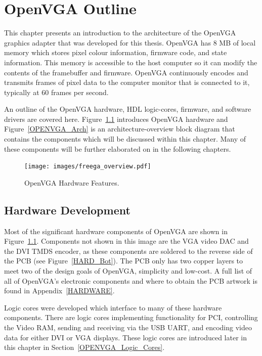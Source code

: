\chapter{OpenVGA Outline}
\label{OPENVGA}

This chapter presents an introduction to the architecture of the OpenVGA graphics
adapter that was developed for this thesis. OpenVGA has 8 MB of local memory
which stores pixel colour information, firmware code, and state information. This
memory is accessible to the host computer so it can modify the contents of the
framebuffer and firmware. OpenVGA continuously encodes and transmits frames of
pixel data to the computer monitor that is connected to it, typically at 60
frames per second.

An outline of the OpenVGA hardware, HDL logic-cores, firmware, and software
drivers are covered here. Figure~\ref{OPENVGA_OpenVGA} introduces OpenVGA
hardware and Figure~\ref{OPENVGA_Arch} is an architecture-overview block diagram
that contains the components which will be discussed within this chapter. Many of
these components will be further elaborated on in the following chapters.

\begin{figure}[h!]
\begin{center}
\texttt{[image: images/freega\_overview.pdf]}
\caption[OpenVGA Hardware Features]{OpenVGA Hardware Features.}
\label{OPENVGA_OpenVGA}
\end{center}
\end{figure}


\section{Hardware Development}
\label{OPENVGA_Hardware}

Most of the significant hardware components of OpenVGA are shown in
Figure~\ref{OPENVGA_OpenVGA}. Components not shown in this image are the VGA
video DAC and
the DVI TMDS encoder, as these components are soldered to the reverse side of the
PCB (see Figure~\ref{HARD_Bot}). The PCB only has two copper layers to meet two
of the design goals of OpenVGA, simplicity and low-cost. A full list of all of
OpenVGA's electronic components and where to obtain the PCB artwork is found in
Appendix~\ref{HARDWARE}.

Logic cores were developed which interface to many of these hardware components.
There are logic cores implementing functionality for PCI, controlling the Video
RAM, sending and receiving via the USB UART, and encoding video data for either
DVI or VGA displays. These logic cores are introduced later in this chapter in
Section~\ref{OPENVGA_Logic_Cores}.

